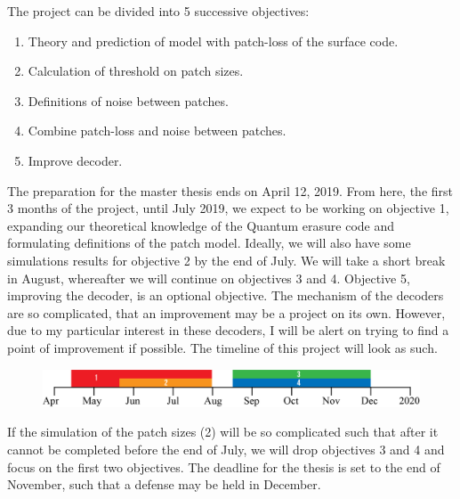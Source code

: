\noindent
The project can be divided into 5 successive objectives:
\begin{enumerate}\label{test}
  \item Theory and prediction of model with patch-loss of the surface code.
  \item Calculation of threshold on patch sizes.
  \item Definitions of noise between patches.
  \item Combine patch-loss and noise between patches.
  \item Improve decoder.
\end{enumerate}
The preparation for the master thesis ends on April 12, 2019. From here, the first 3 months of the project, until July 2019, we expect to be working on objective 1, expanding our theoretical knowledge of the Quantum erasure code and formulating definitions of the patch model. Ideally, we will also have some simulations results for objective 2 by the end of July. We will take a short break in August, whereafter we will continue on objectives 3 and 4. Objective 5, improving the decoder, is an optional objective. The mechanism of the decoders are so complicated, that an improvement may be a project on its own. However, due to my particular interest in these decoders, I will be alert on trying to find a point of improvement if possible. The timeline of this project will look as such.
\begin{figure}[h]
  \centering
  \includegraphics[width=\linewidth]{fig/Timeline.png}
\end{figure}

If the simulation of the patch sizes (2) will be so complicated such that after it cannot be completed before the end of July, we will drop objectives 3 and 4 and focus on the first two objectives. The deadline for the thesis is set to the end of November, such that a defense may be held in December.



